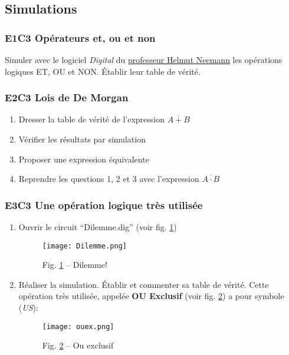 \documentclass[11pt,french]{article}
\makeatletter
\def\maxwidth{\ifdim\Gin@nat@width>\linewidth\linewidth
    \else\Gin@nat@width\fi}
\let\Oldincludegraphics\includegraphics
\renewcommand{\includegraphics}[1]{\Oldincludegraphics[width=.8\maxwidth]{#1}}
\makeatother
\begin{document}
\hypertarget{simulations}{%
\subsection{Simulations}\label{simulations}}
\hypertarget{e1c3}{%
\subsubsection{E1C3 Opérateurs et, ou et non}\label{e1c3}}
Simuler avec le logiciel \emph{Digital} du \href{https://github.com/hneemann/Digital}{professeur Helmut Neemann} les opérations logiques ET, OU et NON. Établir leur table de vérité.

\hypertarget{e2c3}{%
\subsubsection{E2C3 Lois de De Morgan}\label{e2c3}}
\begin{enumerate}
\item Dresser la table de vérité de l'expression \(\overline{A+B}\)
\item Vérifier les résultats par simulation
\item Proposer une expression équivalente
\item Reprendre les questions 1, 2 et 3 avec l'expression \(\overline{A\cdot B}\)
\end{enumerate}

\hypertarget{e3c3-une-opuxe9ration-logique-truxe8s-utilisuxe9e}{%
\subsubsection{E3C3 Une opération logique très
utilisée}\label{e3c3-une-opuxe9ration-logique-truxe8s-utilisuxe9e}}

\begin{enumerate}
\item Ouvrir le circuit ``Dilemme.dig'' (voir fig. \ref{fig:dilemme})

\begin{figure}[!h]
	\begin{center}
		\texttt{[image: Dilemme.png]}
	\end{center}
	\caption{Fig. \ref{fig:dilemme} -- Dilemme!}
	\label{fig:dilemme}
\end{figure}

\item Réaliser la simulation. Établir et commenter sa table de vérité.
Cette opération très utilisée, appelée \textbf{ OU Exclusif} (voir fig. \ref{fig:xor}) a pour symbole (\emph{US}):\\
\begin{figure}[!h]
	\begin{center}
		\texttt{[image: ouex.png]}
	\end{center}
	\caption{Fig. \ref{fig:xor} -- Ou exclusif}
	\label{fig:xor}
\end{figure}
\end{enumerate}
\end{document}
